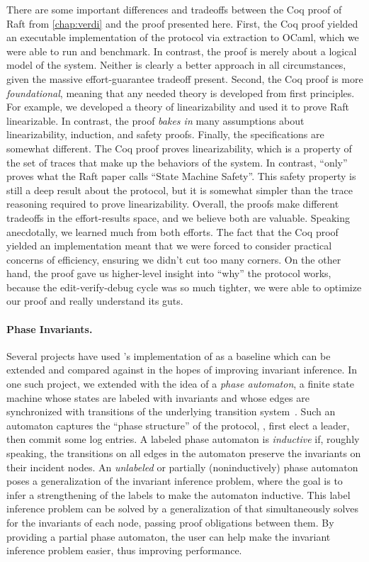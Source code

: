 There are some important differences and tradeoffs between
  the Coq proof of Raft from \cref{chap:verdi}
  and the \mypyvy proof presented here.
First, the Coq proof yielded an executable implementation of the protocol
  via extraction to OCaml, which we were able to run and benchmark.
In contrast, the \mypyvy proof is merely about a logical model of the system.
Neither is clearly a better approach in all circumstances,
  given the massive effort-guarantee tradeoff present.
Second, the Coq proof is more \emph{foundational},
  meaning that any needed theory is developed from first principles.
For example, we developed a theory of linearizability and
  used it to prove Raft linearizable.
In contrast, the \mypyvy proof \emph{bakes in} many assumptions about linearizability, induction, and safety proofs.
Finally, the specifications are somewhat different.
The Coq proof proves linearizability,
  which is a property of the set of traces that make up the behaviors of the system.
In contrast, \mypyvy ``only'' proves what the Raft paper calls ``State Machine Safety''.
This safety property is still a deep result about the protocol,
  but it is somewhat simpler than the trace reasoning required to prove linearizability.
Overall, the proofs make different tradeoffs in the effort-results space,
  and we believe both are valuable.
Speaking anecdotally, we learned much from both efforts.
The fact that the Coq proof yielded an implementation meant
  that we were forced to consider practical concerns of efficiency, ensuring we didn't cut too many corners.
On the other hand, the \mypyvy proof gave us higher-level insight into ``why'' the protocol works,
  because the edit-verify-debug cycle was so much tighter, we were able to optimize our proof and really understand its guts.

\paragraph{Phase Invariants.}
Several projects have used \mypyvy's implementation of \updr as a baseline
  which can be extended and compared against in the hopes of improving invariant inference.
In one such project, we extended \updr with the idea of a \emph{phase automaton},
  a finite state machine whose states are labeled with invariants and
  whose edges are synchronized with transitions of the underlying transition system~\cite{phase-updr}.
Such an automaton captures the ``phase structure'' of the protocol,
  \eg, first elect a leader, then commit some log entries.
A labeled phase automaton is \emph{inductive} if, roughly speaking,
  the transitions on all edges in the automaton preserve the invariants on their incident nodes.
An \emph{unlabeled} or partially (noninductively) phase automaton
  poses a generalization of the invariant inference problem,
  where the goal is to infer a strengthening of the labels to make the automaton inductive.
This label inference problem can be solved by a generalization of \updr
  that simultaneously solves for the invariants of each node,
  passing proof obligations between them.
By providing a partial phase automaton,
  the user can help make the invariant inference problem easier,
  thus improving performance.

